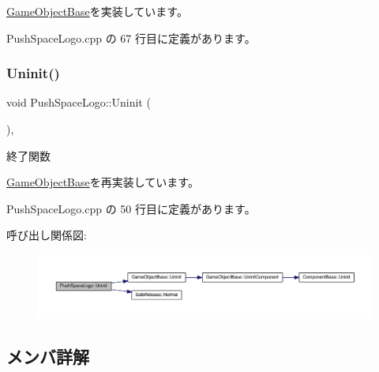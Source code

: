 \mbox{\hyperlink{class_game_object_base_a85c59554f734bcb09f1a1e18d9517dce}{Game\+Object\+Base}}を実装しています。



 Push\+Space\+Logo.\+cpp の 67 行目に定義があります。

\mbox{\label{class_push_space_logo_a06404113db417c58941ca7a13bba161e}} 
\subsubsection{\texorpdfstring{Uninit()}{Uninit()}}
{\footnotesize\ttfamily void Push\+Space\+Logo\+::\+Uninit (\begin{DoxyParamCaption}{ }\end{DoxyParamCaption})\hspace{0.3cm}{\ttfamily [override]}, {\ttfamily [virtual]}}



終了関数 



\mbox{\hyperlink{class_game_object_base_a97e1bc277d7b1c0156d4735de29a022c}{Game\+Object\+Base}}を再実装しています。



 Push\+Space\+Logo.\+cpp の 50 行目に定義があります。

呼び出し関係図\+:\nopagebreak
\begin{figure}[H]
\begin{center}
\leavevmode
\includegraphics[width=350pt]{class_push_space_logo_a06404113db417c58941ca7a13bba161e_cgraph}
\end{center}
\end{figure}


\subsection{メンバ詳解}
\mbox{\label{class_push_space_logo_ab35a4cee269c3ba0b709a8951ccc3d42}} 
